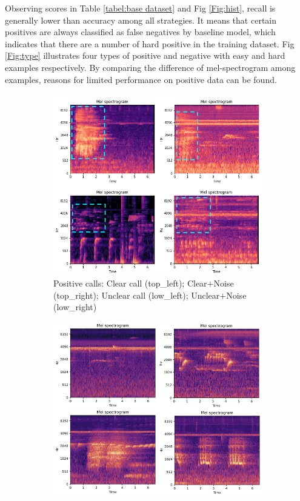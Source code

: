 Observing scores in Table \ref{tabel:base dataset} and Fig \ref{Fig:hist}, recall is generally lower than accuracy among all strategies. It means that certain positives are always classified as false negatives by baseline model, which indicates that there are a number of hard positive in the training dataset. Fig \ref{Fig:type} illustrates four types of positive and negative with easy and hard examples respectively. By comparing the difference of mel-spectrogram among examples, reasons for limited performance on positive data can be found. \par
\begin{figure}[!htb]
\hspace*{-2em}
     \begin{subfigure}[b]{0.5\textwidth}
         \centering
          \includegraphics[scale=0.33]{Figs/chap4/pos.png}
          \caption{\centering Positive calls: Clear call (top\_left); Clear$+$Noise (top\_right); Unclear call (low\_left); Unclear$+$Noise (low\_right)}
     \end{subfigure}
     \hfill
     \begin{subfigure}[b]{0.5\textwidth}
         \centering
          \includegraphics[scale=0.33]{Figs/chap4/neg.png}

\end{subfigure}
\end{figure}
